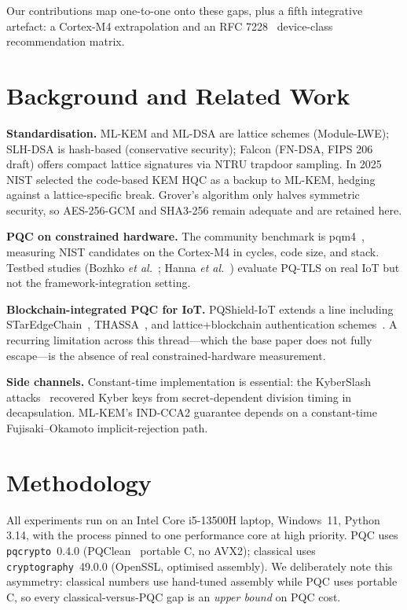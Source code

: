 \documentclass[conference]{IEEEtran}
\begin{document}
\noindent Our contributions map one-to-one onto these gaps, plus a fifth
integrative artefact: a Cortex-M4 extrapolation and an RFC 7228~\cite{rfc7228}
device-class recommendation matrix.

\section{Background and Related Work}
\textbf{Standardisation.} ML-KEM and ML-DSA are lattice schemes (Module-LWE);
SLH-DSA is hash-based (conservative security); Falcon (FN-DSA, FIPS 206 draft)
offers compact lattice signatures via NTRU trapdoor sampling. In 2025 NIST
selected the code-based KEM HQC as a backup to ML-KEM, hedging against a
lattice-specific break. Grover's algorithm only halves symmetric security, so
AES-256-GCM and SHA3-256 remain adequate and are retained here.

\textbf{PQC on constrained hardware.} The community benchmark is
pqm4~\cite{kannwischer2019pqm4}, measuring NIST candidates on the Cortex-M4 in
cycles, code size, and stack. Testbed studies (Bozhko \textit{et
al.}~\cite{bozhko2023pqtls}; Hanna \textit{et al.}~\cite{hanna2025pqtls})
evaluate PQ-TLS on real IoT but not the framework-integration setting.

\textbf{Blockchain-integrated PQC for IoT.} PQShield-IoT extends a line
including STarEdgeChain~\cite{mollah2024staredgechain},
THASSA~\cite{khan2024thassa}, and lattice+blockchain authentication
schemes~\cite{sarkar2024lattice,kuang2025lightweight,prajapat2025quantumsafe,erukala2025hybrid,wang2024lattice}.
A recurring limitation across this thread---which the base paper does not fully
escape---is the absence of real constrained-hardware measurement.

\textbf{Side channels.} Constant-time implementation is essential: the
KyberSlash attacks~\cite{kyberslash2024} recovered Kyber keys from
secret-dependent division timing in decapsulation. ML-KEM's IND-CCA2 guarantee
depends on a constant-time Fujisaki--Okamoto implicit-rejection path.

\section{Methodology}
All experiments run on an Intel Core i5-13500H laptop, Windows~11, Python
3.14, with the process pinned to one performance core at high priority. PQC
uses \texttt{pqcrypto}~0.4.0 (PQClean~\cite{pqclean} portable C, no AVX2);
classical uses \texttt{cryptography}~49.0.0 (OpenSSL, optimised assembly). We
deliberately note this asymmetry: classical numbers use hand-tuned assembly
while PQC uses portable C, so every classical-versus-PQC gap is an
\emph{upper bound} on PQC cost.
\end{document}
